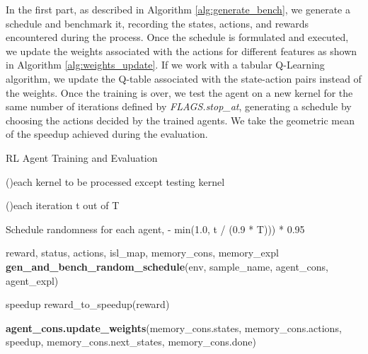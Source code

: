 \documentclass[logo,msc]{infthesis}           %
\begin{document}
In the first part, as described in Algorithm \ref{alg:generate_bench}, we generate a schedule and benchmark it, recording the states, actions, and rewards encountered during the process. Once the schedule is formulated and executed, we update the weights associated with the actions for different features as shown in Algorithm \ref{alg:weights_update}. If we work with a tabular Q-Learning algorithm, we update the Q-table associated with the state-action pairs instead of the weights. Once the training is over, we test the agent on a new kernel for the same number of iterations defined by \textit{FLAGS.stop\_at}, generating a schedule by choosing the actions decided by the trained agents. We take the geometric mean \cite{10.1145/5666.5673} of the speedup achieved during the evaluation.

\begin{algorithm}[H]
\caption{RL Agent Training and Evaluation}\label{alg:agent_training}


\For(){each kernel to be processed except testing kernel}
{    
    \For(){each iteration t out of T}
    {
        
        Schedule randomness for each agent, \epsilon {} - min{\hspace{2}}(1.0,{\hspace{2}} t / (0.9 * T))) * {\hspace{2}}0.95
         
         reward, status, actions, isl\_map, memory\_cons, memory\_expl \gets \textbf{gen\_and\_bench\_random\_schedule}(env, sample\_name, agent\_cons, agent\_expl)
         
         speedup \gets reward\_to\_speedup(reward)
         
         \textbf{agent\_cons.update\_weights}(memory\_cons.states,
                                    memory\_cons.actions,
                                    speedup, memory\_cons.next\_states,
                                    memory\_cons.done)
                                    
}}
\end{algorithm}
\end{document}
